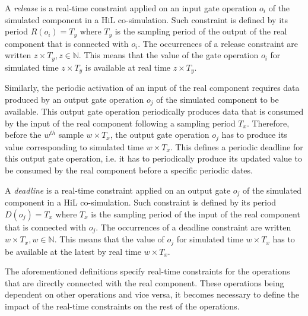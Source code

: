 \begin{definition}
A \textit{release} is a real-time constraint applied on an input gate operation $o_i$ of the simulated component in a HiL co-simulation. Such constraint is defined by its period $R(o_i) = T_{y}$ where $T_{y}$ is the sampling period of the output of the real component that is connected with $o_i$. The occurrences of a release constraint are written $z \times T_{y}, z \in \mathbb{N}$. This means that the value of the gate operation $o_i$ for simulated time $z \times T_{y}$ is available at real time $z \times T_{y}$.
\label{def:release}
\end{definition}

Similarly, the periodic activation of an input of the real component requires data produced by an output gate operation $o_j$ of the simulated component to be available. This output gate operation periodically produces data that is consumed by the input of the real component following a sampling period $T_{x}$. Therefore, before the $w^{th}$ sample $w \times T_{x}$, the output gate operation $o_j$ has to produce its value corresponding to simulated time $w \times T_{x}$. This defines a periodic deadline for this output gate operation, i.e. it has to periodically produce its updated value to be consumed by the real component before a specific periodic dates.

\begin{definition}
A \textit{deadline} is a real-time constraint applied on an output gate $o_j$ of the simulated component in a HiL co-simulation. Such constraint is defined by its period $D(o_j) = T_{x}$ where $T_{x}$ is the sampling period of the input of the real component that is connected with $o_j$. The occurrences of a deadline constraint are written $w \times T_x, w \in \mathbb{N}$. This means that the value of $o_j$ for simulated time $w \times T_x$ has to be available at the latest by real time $w \times T_x$.
\label{def:deadline}
\end{definition}


The aforementioned definitions specify real-time constraints for the operations that are directly connected with the real component. These operations being dependent on other operations and vice versa, it becomes necessary to define the impact of the real-time constraints on the rest of the operations. 

